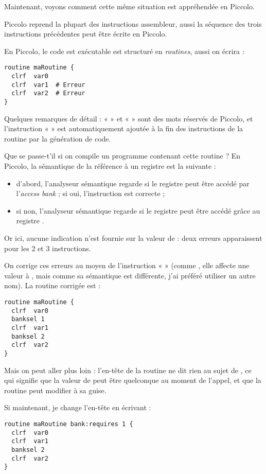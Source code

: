 Maintenant, voyons comment cette même situation est appréhendée en Piccolo.

Piccolo reprend la plupart des instructions assembleur, aussi la séquence des trois instructions précédentes peut être écrite en Piccolo.

En Piccolo, le code est exécutable est structuré en \emph{routines}, aussi on écrira :
\begin{lstlisting}[language=piccolo]
routine maRoutine {
  clrf  var0
  clrf  var1  # Erreur
  clrf  var2  # Erreur
}
\end{lstlisting}

Quelques remarques de détail : «  » et «  » sont des mots réservés de Piccolo, et l’instruction «  » est automatiquement ajoutée à la fin des instructions de la routine par la génération de code.

Que se passe-t'il si on compile un programme contenant cette routine ? En Piccolo, la sémantique de la référence à un registre est la suivante :\begin{itemize}
\item d'abord, l'analyseur sémantique regarde si le registre peut être accédé par l'\emph{access bank} ; si oui, l'instruction est correcte ;
\item si non, l'analyseur sémantique regarde si le registre peut être accédé grâce au registre .
\end{itemize}

Or ici, aucune indication n'est fournie sur la valeur de  : deux erreurs apparaissent pour les 2 et 3 instructions.

On corrige ces erreurs au moyen de l’instruction «  » (comme , elle affecte une valeur à , mais comme sa sémantique est différente, j’ai préféré utiliser un autre nom). La routine corrigée est :
\begin{lstlisting}[language=piccolo]
routine maRoutine {
  clrf  var0
  banksel 1
  clrf  var1
  banksel 2
  clrf  var2
}
\end{lstlisting}


Mais on peut aller plus loin : l’en-tête de la routine ne dit rien au sujet de , ce qui signifie que la valeur de  peut être quelconque au moment de l’appel, et que la routine peut modifier  à sa guise.

Si maintenant, je change l’en-tête en écrivant :
\begin{lstlisting}[language=piccolo]
routine maRoutine bank:requires 1 {
  clrf  var0
  clrf  var1
  banksel 2
  clrf  var2
}
\end{lstlisting}

